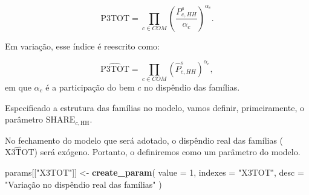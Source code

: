 \documentclass[12pt,twoside]{article}
\newenvironment{Shaded}{\begin{snugshade}}{\end{snugshade}}
\newcommand{\CommentTok}[1]{\textcolor[rgb]{0.56,0.35,0.01}{\textit{#1}}}
\newcommand{\DataTypeTok}[1]{\textcolor[rgb]{0.13,0.29,0.53}{#1}}
\newcommand{\DecValTok}[1]{\textcolor[rgb]{0.00,0.00,0.81}{#1}}
\newcommand{\KeywordTok}[1]{\textcolor[rgb]{0.13,0.29,0.53}{\textbf{#1}}}
\newcommand{\NormalTok}[1]{#1}
\newcommand{\OperatorTok}[1]{\textcolor[rgb]{0.81,0.36,0.00}{\textbf{#1}}}
\newcommand{\StringTok}[1]{\textcolor[rgb]{0.31,0.60,0.02}{#1}}
\let\oldShaded\Shaded
\let\endoldShaded\endShaded
\renewenvironment{Shaded}{\footnotesize\oldShaded}{\endoldShaded}
\begin{document}
\[ \text{P3TOT} = \prod_{c \in COM} \left(\frac{P^s_{c,HH}}{\alpha_c}\right)^{\alpha_c}.\]

Em variação, esse índice é reescrito como:

\[ \hat{\text{P3TOT}} = \prod_{c \in COM} \left(\hat{P}^s_{c,HH}\right)^{\alpha_c},\]
em que \(\alpha_c\) é a participação do bem \(c\) no dispêndio das
famílias.

Especificado a estrutura das famílias no modelo, vamos definir,
primeiramente, o parâmetro \(\text{SHARE}_{c,\text{HH}}\).

\begin{Shaded}
\end{Shaded}

No fechamento do modelo que será adotado, o dispêndio real das famílias
(\(\hat{\text{X3TOT}}\)) será exógeno. Portanto, o definiremos como um
parâmetro do modelo.

\begin{Shaded}
\begin{Highlighting}[]
\NormalTok{params[[}\StringTok{"X3TOT"}\NormalTok{]] <-}\StringTok{ }\KeywordTok{create_param}\NormalTok{(}
  \DataTypeTok{value =} \DecValTok{1}\NormalTok{,}
  \DataTypeTok{indexes =} \StringTok{"X3TOT"}\NormalTok{,}
  \DataTypeTok{desc =} \StringTok{"Variação no dispêndio real das famílias"}
\NormalTok{)}
\end{Highlighting}
\end{Shaded}
\end{document}
